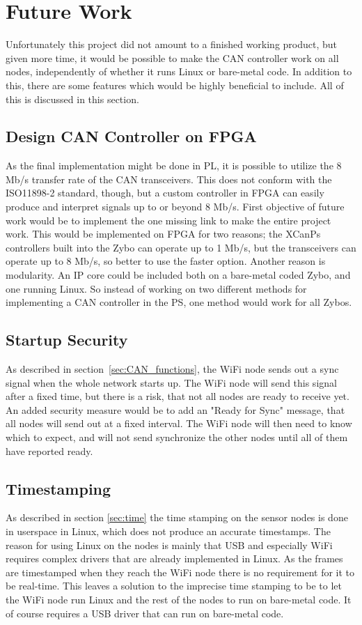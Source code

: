 
\section{Future Work}\label{sec:future_work}
Unfortunately this project did not amount to a finished working product, but given more time, it would be possible to make the CAN controller work on all nodes, independently of whether it runs Linux or bare-metal code.
In addition to this, there are some features which would be  highly beneficial to include.
All of this is discussed in this section.

\subsection*{Design CAN Controller on FPGA}
As the final implementation might be done in PL, it is possible to utilize the 8 Mb/s transfer rate of the CAN transceivers.
This does not conform with the ISO11898-2 standard, though, but a custom controller in FPGA can easily produce and interpret signals up to or beyond 8 Mb/s.
First objective of future work would be to implement the one missing link to make the entire project work.
This would be implemented on FPGA for two reasons;
the XCanPs controllers built into the Zybo can operate up to 1 Mb/s, but the transceivers can operate up to 8 Mb/s, so better to use the faster option.
Another reason is modularity.
An IP core could be included both on a bare-metal coded Zybo, and one running Linux.
So instead of working on two different methods for implementing a CAN controller in the PS, one method would work for all Zybos.

\subsection*{Startup Security}
As described in section~\ref{sec:CAN_functions}, the WiFi node sends out a sync signal when the whole network starts up.
The WiFi node will send this signal after a fixed time, but there is a risk, that not all nodes are ready to receive yet. 
An added security measure would be to add an "Ready for Sync" message, that all nodes will send out at a fixed interval.
The WiFi node will then need to know which to expect, and will not send synchronize the other nodes until all of them have reported ready.

\subsection*{Timestamping}
As described in section \ref{sec:time} the time stamping on the sensor nodes is done in userspace in Linux, which does not produce an  accurate timestamps.
The reason for using Linux on the nodes is mainly that USB and especially WiFi requires complex drivers that are already implemented in Linux.
As the frames are timestamped when they reach the WiFi node there is no requirement for it to be real-time.
This leaves a solution to the imprecise time stamping to be to let the WiFi node run Linux and the rest of the nodes to run on bare-metal code.
It of course requires a USB driver that can run on bare-metal code.

